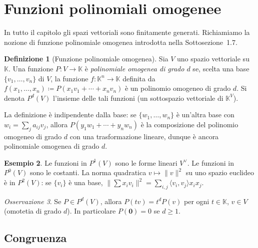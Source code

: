 \documentclass[11pt, a4paper]{book}
\theoremstyle{definition}
\newtheorem{definizione}{Definizione}[section]
\newtheorem{esempio}[definizione]{Esempio}
\theoremstyle{plain}
\theoremstyle{remark}
\newtheorem{osservazione}[definizione]{Osservazione}
\newcommand{\K}{\mathbb{K}}
\begin{document}
\section{Funzioni polinomiali omogenee}
\label{sec:funz-pol-omog}

In tutto il capitolo gli spazi vettoriali sono finitamente generati. Richiamiamo la nozione di funzione polinomiale omogenea introdotta nella Sottosezione~1.7.

\begin{defbox}
\begin{definizione}[Funzione polinomiale omogenea]
\label{def:pol-omog}
Sia $V$ uno spazio vettoriale su $\K$. Una funzione $P \colon V \to \K$ è \emph{polinomiale omogenea di grado $d$} se, scelta una base $\{v_1,\ldots,v_n\}$ di $V$, la funzione $f \colon \K^n \to \K$ definita da $f(x_1,\ldots,x_n) \coloneqq P(x_1v_1+\cdots+x_nv_n)$ è un polinomio omogeneo di grado $d$. Si denota $P^d(V)$ l'insieme delle tali funzioni (un sottospazio vettoriale di $\K^V$).
\end{definizione}
\end{defbox}

La definizione è indipendente dalla base: se $\{w_1,\ldots,w_n\}$ è un'altra base con $w_i = \sum_j a_{ij}v_j$, allora $P(y_1w_1+\cdots+y_nw_n)$ è la composizione del polinomio omogeneo di grado $d$ con una trasformazione lineare, dunque è ancora polinomiale omogenea di grado $d$.

\begin{exbox}
\begin{esempio}
Le funzioni in $P^1(V)$ sono le forme lineari $V^\vee$. Le funzioni in $P^0(V)$ sono le costanti. La norma quadratica $v \mapsto \|v\|^2$ su uno spazio euclideo è in $P^2(V)$: se $\{v_i\}$ è una base, $\|{\textstyle\sum} x_iv_i\|^2 = \sum_{i,j}\langle v_i,v_j\rangle x_ix_j$.
\end{esempio}
\end{exbox}

\begin{osservazione}
\label{oss:omog-proprieta}
Se $P \in P^d(V)$, allora $P(tv) = t^d P(v)$ per ogni $t \in \K$, $v \in V$ (omotetia di grado $d$). In particolare $P(\mathbf{0}) = 0$ se $d \geq 1$.
\end{osservazione}

\subsection{Congruenza}
\end{document}
